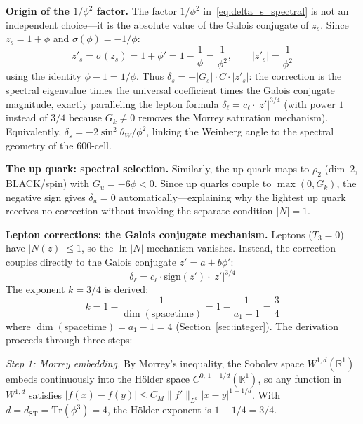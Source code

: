 \documentclass[12pt,a4paper]{article}
\theoremstyle{definition}
\begin{document}
\textbf{Origin of the $1/\phi^2$ factor.}  The factor $1/\phi^2$ in~\eqref{eq:delta_s_spectral} is not an independent choice---it is the absolute value of the Galois conjugate of $z_s$.  Since $z_s = 1 + \phi$ and $\sigma(\phi) = -1/\phi$:
\begin{equation}
z'_s = \sigma(z_s) = 1 + \phi' = 1 - \frac{1}{\phi} = \frac{1}{\phi^2}, \qquad |z'_s| = \frac{1}{\phi^2}
\label{eq:zs_galois}
\end{equation}
using the identity $\phi - 1 = 1/\phi$.  Thus $\delta_s = -|G_s|\cdot C \cdot |z'_s|$: the correction is the spectral eigenvalue times the universal coefficient times the Galois conjugate magnitude, exactly paralleling the lepton formula $\delta_\ell = c_\ell \cdot |z'|^{3/4}$ (with power $1$ instead of $3/4$ because $G_k \neq 0$ removes the Morrey saturation mechanism).  Equivalently, $\delta_s = -2\sin^2\theta_W/\phi^2$, linking the Weinberg angle to the spectral geometry of the 600-cell.

\textbf{The up quark: spectral selection.}  Similarly, the up quark maps to $\rho_2$ (dim~$2$, BLACK/spin) with $G_u = -6\phi < 0$.  Since up quarks couple to $\max(0, G_k)$, the negative sign gives $\delta_u = 0$ automatically---explaining why the lightest up quark receives no correction without invoking the separate condition $|N| = 1$.

\textbf{Lepton corrections: the Galois conjugate mechanism.} Leptons ($T_3 = 0$) have $|N(z)| \leq 1$, so the $\ln|N|$ mechanism vanishes. Instead, the correction couples directly to the Galois conjugate $z' = a + b\phi'$:
\begin{equation}
\boxed{\delta_\ell = c_\ell \cdot \mathrm{sign}(z') \cdot |z'|^{3/4}}
\label{eq:lepton_corr}
\end{equation}
The exponent $k = 3/4$ is derived:
\begin{equation}
\boxed{k = 1 - \frac{1}{\dim(\text{spacetime})} = 1 - \frac{1}{a_1 - 1} = \frac{3}{4}}
\label{eq:lepton_k}
\end{equation}
where $\dim(\text{spacetime}) = a_1 - 1 = 4$ (Section~\ref{sec:integer}).  The derivation proceeds through three steps:

\emph{Step 1: Morrey embedding.}  By Morrey's inequality, the Sobolev space $W^{1,d}(\mathbb{R}^1)$ embeds continuously into the H\"{o}lder space $C^{0,\,1-1/d}(\mathbb{R}^1)$, so any function in $W^{1,d}$ satisfies $|f(x) - f(y)| \leq C_M \|f'\|_{L^d} |x-y|^{1-1/d}$.  With $d = d_{\text{ST}} = \mathrm{Tr}(\phi^3) = 4$, the H\"{o}lder exponent is $1 - 1/4 = 3/4$.
\end{document}
